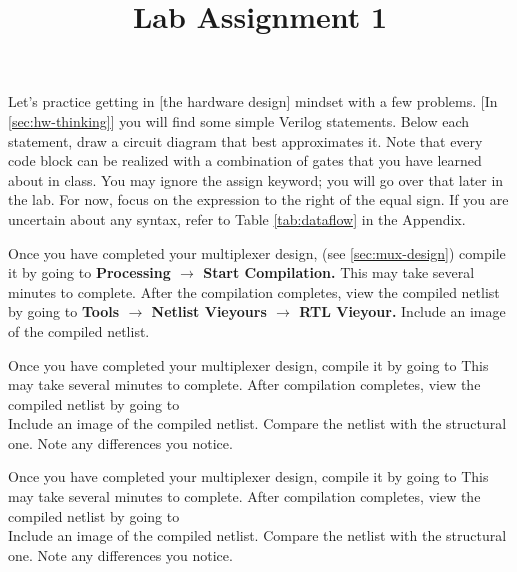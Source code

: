 \documentclass[12pt]{labmanual}
\title{Lab Assignment 1 }
\author{}
\date{}
\begin{document}
\maketitle
\makeheaders
\clearpage
\tableofcontents
\clearpage 
\begin{questionssection}
\begin{question}[Practice]
    Let's practice getting in [the hardware design] mindset with a few problems. [In \autoref{sec:hw-thinking}] you will find some simple Verilog statements. Below each statement, draw a circuit diagram that best approximates it. Note that every code block can be realized with a combination of gates that you have learned about in class. You may ignore the assign keyword; you will go over that later in the lab. For now, focus on the expression to the right of the equal sign. If you are uncertain about any syntax, refer to Table \ref{tab:dataflow} in the Appendix.
\end{question}

\begin{question}
    Once you have completed your multiplexer design, (see \autoref{sec:mux-design}) compile it by going to \textbf{Processing $\longrightarrow$ Start Compilation.} This may take several minutes to complete. After the compilation completes, view the compiled netlist by going to \textbf{Tools $\longrightarrow$ Netlist Vieyours $\longrightarrow$ RTL Vieyour.} Include an image of the compiled netlist.
\end{question}

\begin{question}
    Once you have completed your multiplexer design, compile it by going to  This may take several minutes to complete. After compilation completes, view the compiled netlist by going to  \\
    Include an image of the compiled netlist. Compare the netlist with the structural one. Note any differences you notice.
\end{question}

\begin{question}
    Once you have completed your multiplexer design, compile it by going to  This may take several minutes to complete. After compilation completes, view the compiled netlist by going to  \\
    Include an image of the compiled netlist. Compare the netlist with the structural one. Note any differences you notice.
\end{question}


\end{questionssection}
\end{document}
